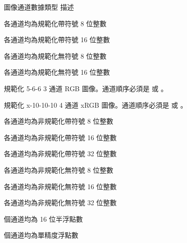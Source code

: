 \bTABLE[option=stretch]

\bTABLEhead
\bTR[background=color,backgroundcolor=gray]
  \bTH 圖像通道數據類型 \eTH
  \bTH 描述 \eTH
\eTR
\eTABLEhead

\bTABLEbody

\bTR
  \bTD {} \eTD
  \bTD 各通道均為規範化帶符號 8 位整數 \eTD
\eTR

\bTR
  \bTD {} \eTD
  \bTD 各通道均為規範化帶符號 16 位整數 \eTD
\eTR

\bTR
  \bTD {} \eTD
  \bTD 各通道均為規範化無符號 8 位整數 \eTD
\eTR

\bTR
  \bTD {} \eTD
  \bTD 各通道均為規範化無符號 16 位整數 \eTD
\eTR

\bTR
  \bTD {} \eTD
  \bTD 規範化 5-6-6 3 通道 RGB 圖像。通道順序必須是  或 。 \eTD
\eTR

\bTR
  \bTD {} \eTD
  \bTD 規範化 x-10-10-10 4 通道 xRGB 圖像。通道順序必須是  或 。 \eTD
\eTR

\bTR
  \bTD {} \eTD
  \bTD 各通道均為非規範化帶符號 8 位整數 \eTD
\eTR

\bTR
  \bTD {} \eTD
  \bTD 各通道均為非規範化帶符號 16 位整數 \eTD
\eTR

\bTR
  \bTD {} \eTD
  \bTD 各通道均為非規範化帶符號 32 位整數 \eTD
\eTR

\bTR
  \bTD {} \eTD
  \bTD 各通道均為非規範化無符號 8 位整數 \eTD
\eTR

\bTR
  \bTD {} \eTD
  \bTD 各通道均為非規範化無符號 16 位整數 \eTD
\eTR

\bTR
  \bTD {} \eTD
  \bTD 各通道均為非規範化無符號 32 位整數 \eTD
\eTR

\bTR
  \bTD {} \eTD
  \bTD 個通道均為 16 位半浮點數 \eTD
\eTR

\bTR
  \bTD {} \eTD
  \bTD 個通道均為單精度浮點數 \eTD
\eTR

\eTABLEbody

\eTABLE

